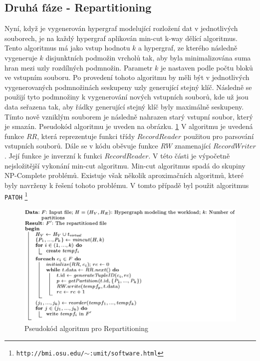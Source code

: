 \documentclass[thesis=M,czech]{FITthesis}[2012/06/26]
\begin{document}
\subsection{Druhá fáze - Repartitioning}
Nyní, když je vygenerován hypergraf modelující rozložení dat v jednotlivých souborech, je na každý hypergraf aplikován min-cut k-way dělící algoritmus. Tento algoritmus má jako vstup hodnotu $k$ a hypergraf, ze kterého následně vygeneruje $k$ disjunktních podmožin vrcholů tak, aby byla minimalizována suma hran mezi uzly rozdílných podmnožin. Parametr $k$ je nastaven podle počtu bloků ve vstupním souboru. Po provedení tohoto algoritmu by měli být v jednotlivých vygenerovaných podmnožinách  seskupeny uzly generující stejný klíč. Následně se použijí tyto podmnožiny k vygenerování nových vstupních souborů, kde už jsou data seřazena tak, aby řádky generující stejný klíč byly maximálně seskupeny. Tímto nově vzniklým souborem je následně nahrazen starý vstupní soubor, který je smazán. Pseudokód algoritmu je uveden na obrázku. \ref{fig:alg2} V algoritmu je uvedená funkce $RR$, která reprezentuje funkci třídy $RecordReader$  použitou pro parsování vstupních souborů. Dále se v kódu oběvuje funkce $RW$ znamenající $RecordWriter$. Její funkce je inverzní k funkci $RecordReader$. V této části je výpočetně nejsložitější vykonání min-cut algoritmu. Min-cut algoritmus spadá do skupiny NP-Complete problémů. Existuje však několik aproximačních algoritmů, které byly navrženy k řešení tohoto problému. V tomto případě byl použit algoritmus \texttt{PATOH} \footnote{\texttt{http://bmi.osu.edu/$\sim$:umit/software.html}}

\begin{figure}\centering
	\includegraphics[width=1\textwidth, angle=0]{files/alg2}
	\caption[Pseudokód algoritmu pro Repartitioning]
	{Pseudokód algoritmu pro Repartitioning}\label{fig:alg2}
\end{figure} 
\end{document}
